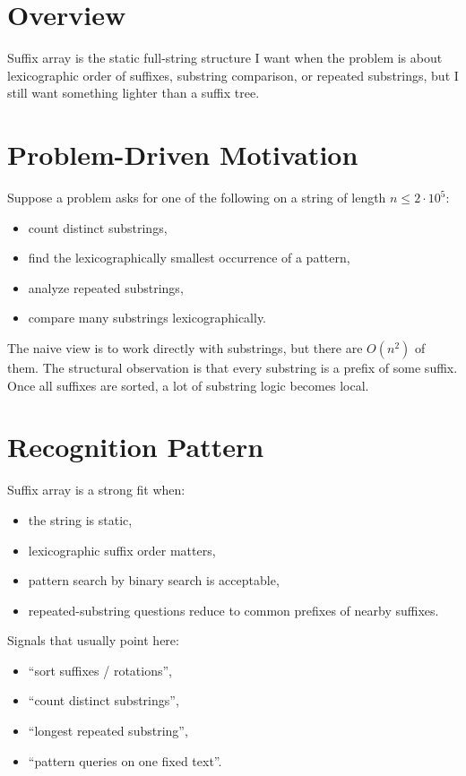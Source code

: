 \section*{Overview}

Suffix array is the static full-string structure I want when the problem is about lexicographic order of suffixes,
substring comparison, or repeated substrings, but I still want something lighter than a suffix tree.

\section*{Problem-Driven Motivation}

Suppose a problem asks for one of the following on a string of length \(n \le 2 \cdot 10^5\):

\begin{itemize}
  \item count distinct substrings,
  \item find the lexicographically smallest occurrence of a pattern,
  \item analyze repeated substrings,
  \item compare many substrings lexicographically.
\end{itemize}

The naive view is to work directly with substrings, but there are \(O(n^2)\) of them. The structural observation is
that every substring is a prefix of some suffix. Once all suffixes are sorted, a lot of substring logic becomes local.

\section*{Recognition Pattern}

Suffix array is a strong fit when:

\begin{itemize}
  \item the string is static,
  \item lexicographic suffix order matters,
  \item pattern search by binary search is acceptable,
  \item repeated-substring questions reduce to common prefixes of nearby suffixes.
\end{itemize}

Signals that usually point here:

\begin{itemize}
  \item ``sort suffixes / rotations'',
  \item ``count distinct substrings'',
  \item ``longest repeated substring'',
  \item ``pattern queries on one fixed text''.
\end{itemize}

